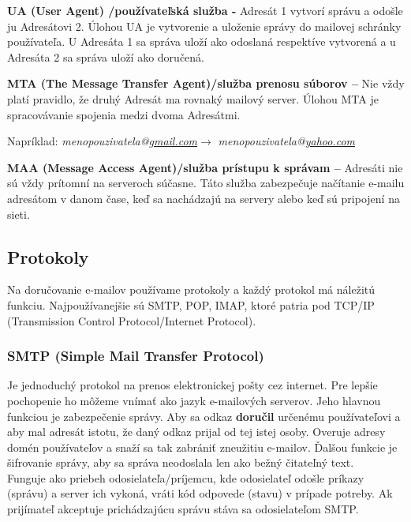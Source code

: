 \documentclass[10pt,twoside,slovak,a4paper]{article}
\begin{document}
\textbf{UA (User Agent) /používateľská služba -} Adresát 1 vytvorí správu a odošle ju Adresátovi 2. Úlohou UA je vytvorenie a uloženie správy do mailovej schránky používateľa. U Adresáta 1 sa správa uloží ako odoslaná respektíve vytvorená a u Adresáta 2 sa správa uloží ako doručená.\cite{GORALSKI}\par
\vspace{0.4cm}
\textbf{MTA (The Message Transfer Agent)/služba prenosu súborov –} Nie vždy platí pravidlo, že druhý Adresát ma rovnaký mailový server. Úlohou MTA je spracovávanie spojenia medzi dvoma Adresátmi.\par Napríklad: \textit{menopouzivatela@\underline{gmail.com}}$\rightarrow$ \textit{menopouzivatela@\underline{yahoo.com}}\par
\vspace{0.4cm}
\textbf{MAA (Message Access Agent)/služba prístupu k správam –} Adresáti nie sú vždy prítomní na serveroch súčasne. Táto služba zabezpečuje načítanie e-mailu adresátom v danom čase, keď sa nachádzajú na servery alebo keď sú pripojení na sieti.\cite{GORALSKI}

\subsection{Protokoly} 

Na doručovanie e-mailov používame protokoly a každý protokol má náležitú funkciu. Najpoužívanejšie sú SMTP, POP, IMAP, ktoré patria pod TCP/IP (Transmission Control Protocol/Internet Protocol).\cite{GORALSKI}

\subsubsection{SMTP (Simple Mail Transfer Protocol)}

Je jednoduchý protokol na prenos elektronickej pošty cez internet. Pre lepšie pochopenie ho môžeme vnímať ako jazyk e-mailových serverov. Jeho hlavnou funkciou je zabezpečenie správy. Aby sa odkaz \textbf{doručil} určenému používateľovi a aby mal adresát istotu, že daný odkaz prijal od tej istej osoby. Overuje adresy domén používateľov a snaží sa tak zabrániť zneužitiu e-mailov. Ďalšou funkcie je šifrovanie správy, aby sa správa neodoslala len ako bežný čitateľný text. \\
\hspace{0.5cm}
Funguje ako priebeh odosielateľa/príjemcu, kde odosielateľ odošle príkazy (správu) a server ich vykoná, vráti kód odpovede (stavu) v prípade potreby. Ak prijímateľ akceptuje prichádzajúcu správu stáva sa odosielateľom SMTP.\cite{GORALSKI,active}
\end{document}
